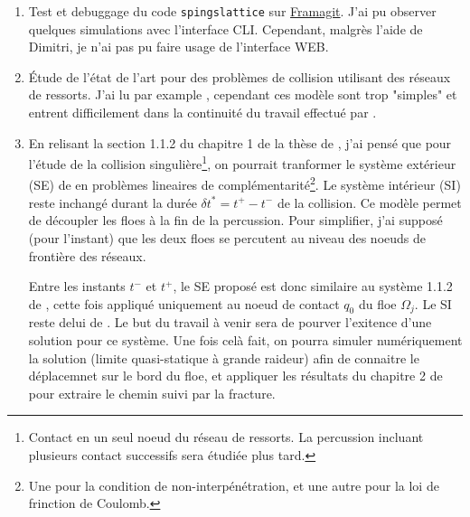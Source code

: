 \documentclass[
  french,
	11pt, %
]{fphw}
\begin{document}
\begin{enumerate}
  \item Test et debuggage du code \verb|spingslattice| sur \href{https://framagit.org/RaK/SimuRessorts}{Framagit}. J'ai pu observer quelques simulations avec l'interface CLI. Cependant, malgrès l'aide de Dimitri, je n'ai pas pu faire usage de l'interface WEB.
  \item Étude de l'état de l'art pour des problèmes de collision utilisant des réseaux de ressorts. J'ai lu par example \parencite{islam2020numerical,gerivani2019proposing,homodeling,manea2021simplified}, cependant ces modèle sont trop "simples" et entrent difficilement dans la continuité du travail effectué par \citeauthor{balasoiu2020halthesis}.
  \item En relisant la section 1.1.2 du chapitre 1 de la thèse de \citeauthor{rabatel2015thesis} \parencite[p.18]{rabatel2015thesis}, j'ai pensé que pour l'étude de la collision singulière\footnote{Contact en un seul noeud du réseau de ressorts. La percussion incluant plusieurs contact successifs sera étudiée plus tard.}, on pourrait tranformer le système extérieur (SE) de \parencite[p.188]{balasoiu2020halthesis} en problèmes lineaires de complémentarité\footnote{Une pour la condition de non-interpénétration, et une autre pour la loi de frinction de Coulomb.}. Le système intérieur (SI) reste inchangé durant la durée $\delta t^{*} = t^{+} - t^{-}$ de la collision. Ce modèle permet de découpler les floes à la fin de la percussion. Pour simplifier, j'ai supposé (pour l'instant) que les deux floes se percutent au niveau des noeuds de frontière des réseaux.
  

  Entre les instants $t^{-}$ et $ t^{+}$, le SE proposé est donc similaire au système 1.1.2 de \parencite[p.35]{rabatel2015thesis}, cette fois appliqué uniquement au noeud de contact $q_0$ du floe $\Omega_j$. Le SI reste delui de \parencite[p.188]{balasoiu2020halthesis}.
  Le but du travail à venir sera de pourver l'exitence d'une solution pour ce système. Une fois celà fait, on pourra simuler numériquement la solution (limite quasi-statique à grande raideur) afin de connaitre le déplacemnet sur le bord du floe, et appliquer les résultats du chapitre 2 de \parencite{balasoiu2020halthesis} pour extraire le chemin suivi par la fracture.
\end{enumerate}

\end{document}
